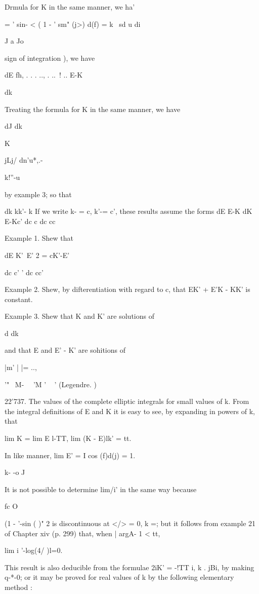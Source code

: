 Drmula for K in the same manner, we ha'

= ' sin- < ( 1 -  ' sm" (j>) d(f) = k \ sd u di

J a Jo

sign of integration  ), we have

dE fh, . . . .., . ..\ ! .. E-K

dk

Treating the formula for K in the same manner, we have

dJ dk

K

jLj/ dn'u*,.-

k!''-u

by example 3; so that

dk kk'- k If we write k- = c, k'-= c', these results assume the forms
dE E-K dK E-Kc' dc c dc cc

Example 1. Shew that

 dE K'~E' 2 = cK'-E'

dc c' ' dc cc'

Example 2. Shew, by difterentiation with regard to c, that EK' + E'K -
KK' is constant.

Example 3. Shew that K and K' are solutions of

d dk

and that E and E' - K' are sohitions of

|m' | |= ..,

 '" ~M- \ \ 'M ' ~ ' (Legendre. )

22'737. The values of the complete elliptic integrals for small values
of k. From the integral definitions of E and K it is easy to see, by
expanding in powers of k, that

lim K = lim E l-TT, lim (K - E)lk' = tt.

In like manner, lim E' = I cos (f)d(j) = 1.

k- -o J

It is not possible to determine lim/i' in the same way because

fc O

(1 - '-sin ( )" 2 is discontinuous at </> = 0, k =; but it follows
from example 21 of Chapter xiv (p. 299) that, when | argA- 1 < tt,

lim i '-log(4/ )l=0.

%
%

This result is also deducible from the formulae 2iK' = -!TT i, k .
jBi, by making q-*-0; or it may be proved for real values of k by the
following elementary method :

